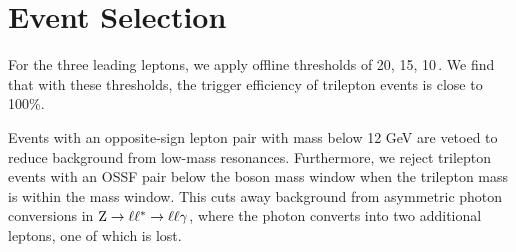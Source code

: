 \chapter{Event Selection}
\label{sec:Selection}

For the three leading leptons, we apply offline thresholds of 20, 15, 10\,\GeV. We find that with these thresholds, the trigger efficiency of trilepton events is close to 100\%.

Events with an opposite-sign lepton pair with mass below 12 GeV are vetoed to reduce background from low-mass resonances. Furthermore, we reject trilepton events with an OSSF pair below the \Z boson mass window when the trilepton mass is within the \Z mass window. This cuts away background from asymmetric photon conversions in $\mathrm{Z} \to \ell\ell^* \to \ell\ell\gamma$, where the photon converts into two additional leptons, one of which is lost.
